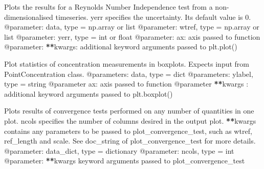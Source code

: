 \documentclass[letterpaper,10pt,english]{sphinxmanual}
\begin{document}

\begin{fulllineitems}
\label{\detokenize{index:windtunnel.plot_Re_independence}}
Plots the results for a Reynolds Number Independence test from a non-
dimensionalised timeseries. yerr specifies the uncertainty. Its default 
value is 0.
@parameter: data, type = np.array or list
@parameter: wtref, type = np.array or list
@parameter: yerr, type = int or float
@parameter: ax: axis passed to function
@parameter: {\color{red}\bfseries{}**}kwargs: additional keyword arguments passed to plt.plot()

\end{fulllineitems}


\begin{fulllineitems}
\label{\detokenize{index:windtunnel.plot_boxplots}}
Plot statistics of concentration measurements in boxplots. Expects
input from PointConcentration class.
@parameters: data, type = dict
@parameters: ylabel, type = string
@parameter ax: axis passed to function
@parameter {\color{red}\bfseries{}**}kwargs : additional keyword arguments passed to plt.boxplot()

\end{fulllineitems}


\begin{fulllineitems}
\label{\detokenize{index:windtunnel.plot_convergence}}
Plots results of convergence tests performed on any number of 
quantities in one plot. ncols specifies the number of columns desired in
the output plot. {\color{red}\bfseries{}**}kwargs contains any parameters to be passed to 
plot\_convergence\_test, such as wtref, ref\_length and scale. See doc\_string
of plot\_convergence\_test for more details.
@parameter: data\_dict, type = dictionary
@parameter: ncols, type = int
@parameter: {\color{red}\bfseries{}**}kwargs keyword arguments passed to plot\_convergence\_test

\end{fulllineitems}
\end{document}

